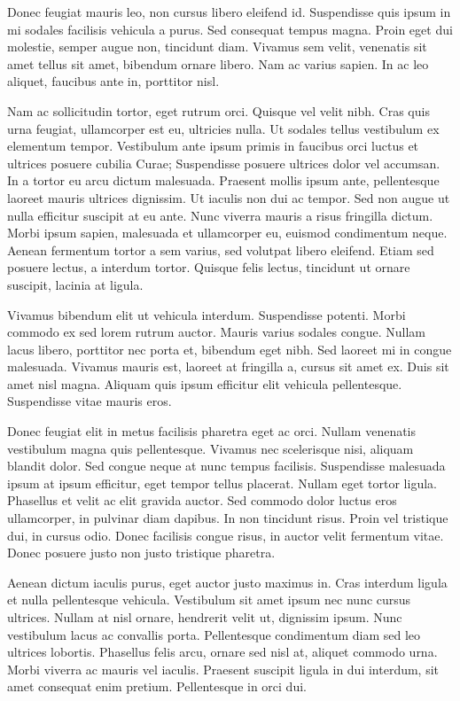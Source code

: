 \documentclass[a4paper,twoside,notitlepage,openright,11pt]{report}
\begin{document}
Donec feugiat mauris leo, non cursus libero eleifend id. Suspendisse quis ipsum in mi sodales facilisis vehicula a purus. Sed consequat tempus magna. Proin eget dui molestie, semper augue non, tincidunt diam. Vivamus sem velit, venenatis sit amet tellus sit amet, bibendum ornare libero. Nam ac varius sapien. In ac leo aliquet, faucibus ante in, porttitor nisl.

Nam ac sollicitudin tortor, eget rutrum orci. Quisque vel velit nibh. Cras quis urna feugiat, ullamcorper est eu, ultricies nulla. Ut sodales tellus vestibulum ex elementum tempor. Vestibulum ante ipsum primis in faucibus orci luctus et ultrices posuere cubilia Curae; Suspendisse posuere ultrices dolor vel accumsan. In a tortor eu arcu dictum malesuada. Praesent mollis ipsum ante, pellentesque laoreet mauris ultrices dignissim. Ut iaculis non dui ac tempor. Sed non augue ut nulla efficitur suscipit at eu ante. Nunc viverra mauris a risus fringilla dictum. Morbi ipsum sapien, malesuada et ullamcorper eu, euismod condimentum neque. Aenean fermentum tortor a sem varius, sed volutpat libero eleifend. Etiam sed posuere lectus, a interdum tortor. Quisque felis lectus, tincidunt ut ornare suscipit, lacinia at ligula.

Vivamus bibendum elit ut vehicula interdum. Suspendisse potenti. Morbi commodo ex sed lorem rutrum auctor. Mauris varius sodales congue. Nullam lacus libero, porttitor nec porta et, bibendum eget nibh. Sed laoreet mi in congue malesuada. Vivamus mauris est, laoreet at fringilla a, cursus sit amet ex. Duis sit amet nisl magna. Aliquam quis ipsum efficitur elit vehicula pellentesque. Suspendisse vitae mauris eros.

Donec feugiat elit in metus facilisis pharetra eget ac orci. Nullam venenatis vestibulum magna quis pellentesque. Vivamus nec scelerisque nisi, aliquam blandit dolor. Sed congue neque at nunc tempus facilisis. Suspendisse malesuada ipsum at ipsum efficitur, eget tempor tellus placerat. Nullam eget tortor ligula. Phasellus et velit ac elit gravida auctor. Sed commodo dolor luctus eros ullamcorper, in pulvinar diam dapibus. In non tincidunt risus. Proin vel tristique dui, in cursus odio. Donec facilisis congue risus, in auctor velit fermentum vitae. Donec posuere justo non justo tristique pharetra.

Aenean dictum iaculis purus, eget auctor justo maximus in. Cras interdum ligula et nulla pellentesque vehicula. Vestibulum sit amet ipsum nec nunc cursus ultrices. Nullam at nisl ornare, hendrerit velit ut, dignissim ipsum. Nunc vestibulum lacus ac convallis porta. Pellentesque condimentum diam sed leo ultrices lobortis. Phasellus felis arcu, ornare sed nisl at, aliquet commodo urna. Morbi viverra ac mauris vel iaculis. Praesent suscipit ligula in dui interdum, sit amet consequat enim pretium. Pellentesque in orci dui.
\end{document}
